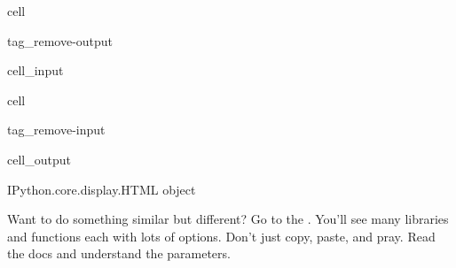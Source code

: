 \documentclass[letterpaper,10pt,english]{jupyterBook}
\begin{document}
\begin{sphinxuseclass}{cell}
\begin{sphinxuseclass}{tag_remove-output}\begin{sphinxVerbatimInput}

\begin{sphinxuseclass}{cell_input}
\begin{sphinxVerbatim}[commandchars=\\\{\}]
  \PYG{p}{[}\PYG{p}{]}
\end{sphinxVerbatim}

\end{sphinxuseclass}\end{sphinxVerbatimInput}

\end{sphinxuseclass}
\end{sphinxuseclass}
\begin{sphinxuseclass}{cell}
\begin{sphinxuseclass}{tag_remove-input}\begin{sphinxVerbatimOutput}

\begin{sphinxuseclass}{cell_output}
\begin{sphinxVerbatim}[commandchars=\\\{\}]
\PYGZlt{}IPython.core.display.HTML object\PYGZgt{}
\end{sphinxVerbatim}

\end{sphinxuseclass}\end{sphinxVerbatimOutput}

\end{sphinxuseclass}
\end{sphinxuseclass}
\begin{sphinxShadowBox}
\sphinxstylesidebartitle{}

\sphinxAtStartPar
Want to do something similar but different? Go to the . You’ll see many libraries and functions each with lots of options. Don’t just copy, paste, and pray. Read the docs and understand the parameters.
\end{sphinxShadowBox}
\end{document}
